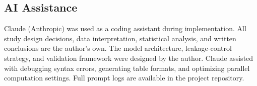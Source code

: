 \documentclass[11pt]{article}
\begin{document}
\subsection*{AI Assistance}
Claude (Anthropic) was used as a coding assistant during implementation. All study design decisions, data interpretation, statistical analysis, and written conclusions are the author's own. The model architecture, leakage-control strategy, and validation framework were designed by the author. Claude assisted with debugging syntax errors, generating table formats, and optimizing parallel computation settings. Full prompt logs are available in the project repository.
\end{document}
